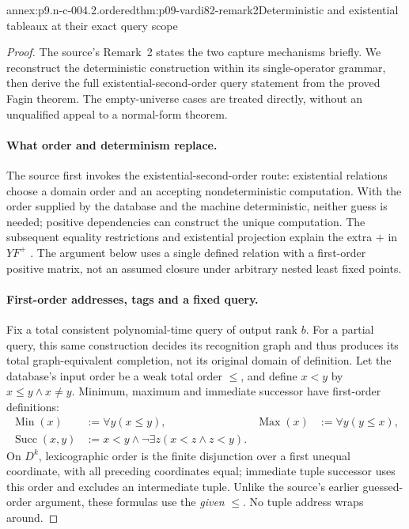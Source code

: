 \begin{annexitem}{annex:p9.n-c-004.2.ordered}{thm:p09-vardi82-remark2}{Deterministic and existential tableaux at their exact query scope}
\begin{proof}
The source's Remark~2 states the two capture mechanisms briefly. We
reconstruct the deterministic construction within its single-operator
grammar, then derive the full existential-second-order query statement
from the proved Fagin theorem. The empty-universe cases are treated
directly, without an unqualified appeal to a normal-form theorem.

\paragraph{What order and determinism replace.}
The source first invokes the existential-second-order route: existential
relations choose a domain order and an accepting nondeterministic
computation.  With the order supplied by the database and the machine
deterministic, neither guess is needed; positive dependencies can construct
the unique computation.  The subsequent equality restrictions and existential
projection explain the extra \(+\) in \(YF^+\)
\cite[Remark~2, pp.~142--143]{Vardi1982}.
The argument below uses a single defined relation with a first-order positive
matrix, not an assumed closure under arbitrary nested least fixed points.

\paragraph{First-order addresses, tags and a fixed query.}
Fix a total consistent polynomial-time query of output rank \(b\).
For a partial query, this same construction decides its recognition graph
and thus produces its total graph-equivalent completion, not its original
domain of definition.
Let the database's input order be a weak total order \(\leq\), and
define \(x<y\) by \(x\leq y\land x\ne y\).
Minimum, maximum and immediate successor have first-order definitions:
\[
\begin{aligned}
 \operatorname{Min}(x)&:=\forall y(x\leq y),&
 \operatorname{Max}(x)&:=\forall y(y\leq x),\\
 \operatorname{Succ}(x,y)&:=x<y\land\neg\exists z(x<z\land z<y).
\end{aligned}
\]
On \(D^k\), lexicographic order is the finite disjunction over a first
unequal coordinate, with all preceding coordinates equal; immediate tuple
successor uses this order and excludes an intermediate tuple.  Unlike the
source's earlier guessed-order argument, these formulas use the \emph{given}
\(\leq\).  No tuple address wraps around.


\end{proof}
\end{annexitem}
